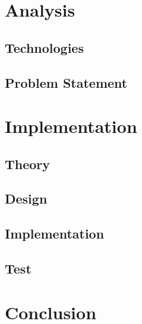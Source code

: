 




 
\tableofcontents



\part{Analysis}





\chapter{Technologies}


\chapter{Problem Statement}



\part{Implementation}

\chapter{Theory}

\chapter{Design}

\chapter{Implementation}


\chapter{Test}


\part{Conclusion}

